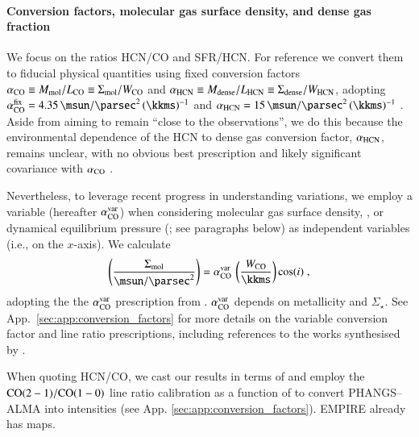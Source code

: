 \documentclass[letter, longauth]{aa} %
\begin{document}
\paragraph{Conversion factors, molecular gas surface density, and dense gas fraction} 
We focus on the ratios HCN/CO and SFR/HCN. 
For reference we convert them to fiducial physical quantities using fixed conversion factors $\alpha_{\text{CO}}\equiv M_{\text{mol}}/L_{\text{CO}}\equiv\Sigma_{\text{mol}}/W_{\text{CO}}$ and $\alpha_{\text{HCN}}\equiv M_{\text{dense}}/L_{\text{HCN}}\equiv\Sigma_{\text{dense}}/W_{\text{HCN}}$, adopting $\alphaco^{\rm fix}=\SI{4.35}{\msun\per\square\parsec}\,(\SI{}{\kkms})^{-1}$ \citep{Bolatto2013} and $\alphahcn=\SI{15}{\msun\per\square\parsec}\,(\SI{}{\kkms})^{-1}$ \citep{Schinnerer2024}. 
Aside from aiming to remain ``close to the observations'', we do this because the environmental dependence of the HCN to dense gas conversion factor, $\alpha_{\rm HCN}$, remains unclear, with no obvious best prescription and likely significant covariance with $\alpha_{\rm CO}$ \citep[see][]{Usero2015}.

Nevertheless, to leverage recent progress in understanding \alphaco variations, we employ a variable \alphaco (hereafter $\alpha_{\text{CO}}^{\rm var}$) when considering molecular gas surface density, \sigmol, or dynamical equilibrium pressure (\pde; see paragraphs below) as independent variables (i.e., on the $x$-axis). We calculate
\begin{align}
\left(\dfrac{\sigmol}{\SI{}{\msun\per\square\parsec}}\right) = \alphaco^{\rm var}\,\left(\dfrac{\intCO}{\SI{}{\kkms}}\right) \cos(i) \;,
\end{align}
adopting the the $\alpha_{\text{CO}}^{\rm var}$ prescription from \citet{Schinnerer2024}. $\alpha_{\text{CO}}^{\rm var}$ depends on metallicity and $\Sigma_\star$. 
See App.~\ref{sec:app:conversion_factors} for more details on the variable conversion factor and line ratio prescriptions, including references to the works synthesised by \citet{Schinnerer2024}.

When quoting HCN/CO, we cast our results in terms of \coone and employ the $\mathrm{CO(2-1)}/\mathrm{CO(1-0)}$ line ratio calibration as a function of \sigsfr to convert PHANGS--ALMA \cotwo into \coone intensities (see App. \ref{sec:app:conversion_factors}). 
EMPIRE already has \coone maps.
\end{document}
